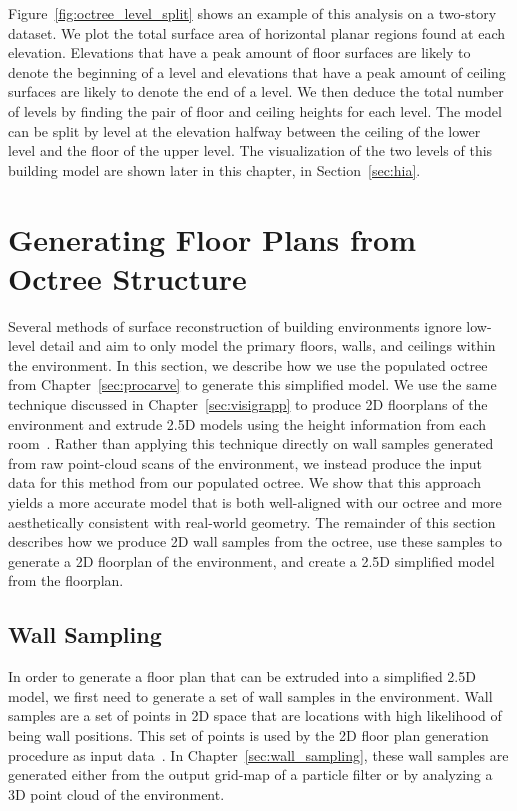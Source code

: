 \documentclass[12pt,onecolumn,oneside]{book}
\begin{document}
Figure~\ref{fig:octree_level_split} shows an example of this analysis on a two-story dataset.  We plot the total surface area of horizontal planar regions found at each elevation.  Elevations that have a peak amount of floor surfaces are likely to denote the beginning of a level and elevations that have a peak amount of ceiling surfaces are likely to denote the end of a level.  We then deduce the total number of levels by finding the pair of floor and ceiling heights for each level.  The model can be split by level at the elevation halfway between the ceiling of the lower level and the floor of the upper level.  The visualization of the two levels of this building model are shown later in this chapter, in Section~\ref{sec:hia}.

\section{Generating Floor Plans from Octree Structure}
\label{sec:oct2fp}

Several methods of surface reconstruction of building environments ignore low-level detail and aim to only model the primary floors, walls, and ceilings within the environment.  In this section, we describe how we use the populated octree from Chapter~\ref{sec:procarve} to generate this simplified model.  We use the same technique discussed in Chapter~\ref{sec:visigrapp} to produce 2D floorplans of the environment and extrude 2.5D models using the height information from each room~\cite{Turner14}.  Rather than applying this technique directly on wall samples generated from raw point-cloud scans of the environment, we instead produce the input data for this method from our populated octree.  We show that this approach yields a more accurate model that is both well-aligned with our octree and more aesthetically consistent with real-world geometry.  The remainder of this section describes how we produce 2D wall samples from the octree, use these samples to generate a 2D floorplan of the environment, and create a 2.5D simplified model from the floorplan.

\subsection{Wall Sampling}
\label{ssec:oct2dq}

In order to generate a floor plan that can be extruded into a simplified 2.5D model, we first need to generate a set of wall samples in the environment.  Wall samples are a set of points in 2D space that are locations with high likelihood of being wall positions.  This set of points is used by the 2D floor plan generation procedure as input data~\cite{Turner14}.  In Chapter~\ref{sec:wall_sampling}, these wall samples are generated either from the output grid-map of a particle filter or by analyzing a 3D point cloud of the environment.
\end{document}
